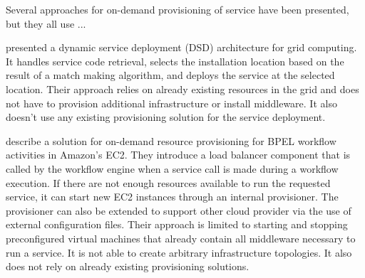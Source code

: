 Several approaches for on-demand provisioning of service have been presented, but they all use ...

\citeauthor*{applyingwebservice} presented a dynamic service deployment (DSD) architecture for grid computing.
It handles service code retrieval, selects the installation location based on the result of a match making algorithm, and deploys the service at the selected location.
Their approach relies on already existing resources in the grid and does not have to provision additional infrastructure or install middleware.
It also doesn't use any existing provisioning solution for the service deployment.

\citeauthor*{ondemandbpel} describe a solution for on-demand resource provisioning for BPEL workflow activities in Amazon's EC2.
They introduce a load balancer component that is called by the workflow engine when a service call is made during a workflow execution.
If there are not enough resources available to run the requested service,
it can start new EC2 instances through an internal provisioner.
The provisioner can also be extended to support other cloud provider via the use of external configuration files.
Their approach is limited to starting and stopping preconfigured virtual machines that already contain all middleware necessary to run a service.
It is not able to create arbitrary infrastructure topologies.
It also does not rely on already existing provisioning solutions.



